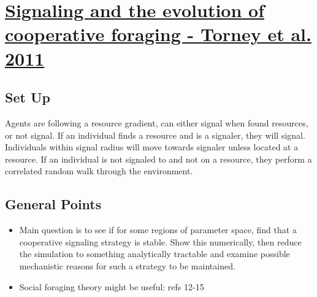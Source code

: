 \documentclass[a4paper,10pt]{article}
\begin{document}
\section*{\href{run:Signalling and the evolution of cooperative foragi.pdf alias}{\color{Blue}Signaling and the evolution of cooperative foraging - Torney et al. 2011}}

\subsection*{Set Up}
Agents are following a resource gradient, can either signal when found resources, or not signal. If an individual finds a resource and is a signaler, they will signal. Individuals within signal radius will move towards signaler unless located at a resource. If an individual is not signaled to and not on a resource, they perform a correlated random walk through the environment. 

\subsection*{General Points}
\begin{itemize}
\item Main question is to see if for some regions of parameter space, find that a cooperative signaling strategy is stable. Show this numerically, then reduce the simulation to something analytically tractable and examine possible mechanistic reasons for such a strategy to be maintained.   
\item Social foraging theory might be useful: refs 12-15
\end{itemize}




\end{document}
